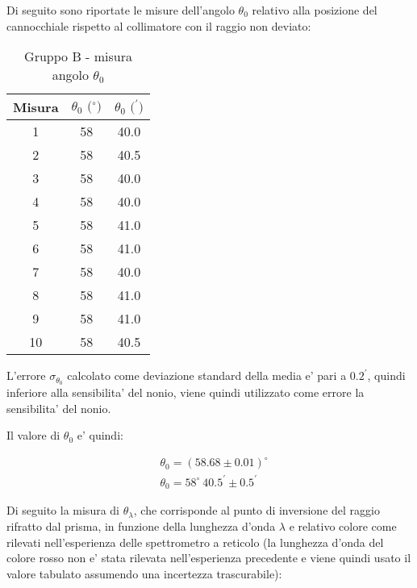 Di seguito sono riportate le misure dell'angolo $\theta_0$ relativo alla posizione del cannocchiale rispetto al collimatore con il raggio non deviato:
\begin{table}[!htbp]
    {\par\centering
    \begin{tabular}{ccc}
        \hline
        Misura & $\theta_0 \text{ ($^{\circ}$)}$ & $\theta_0 \text{ ($^{\prime}$)}$ \\
        \hline
        1   &   58 &   40.0\\
        2   &   58 &   40.5\\
        3   &   58 &   40.0\\
        4   &   58 &   40.0\\
        5   &   58 &   41.0\\
        6   &   58 &   41.0\\
        7   &   58 &   40.0\\
        8   &   58 &   41.0\\
        9   &   58 &   41.0\\
        10  &   58 &   40.5\\
        \hline
    \end{tabular}
    \par}
    \caption{Gruppo B - misura angolo $\theta_0$}
\end{table}

L'errore $\sigma_{\theta_0}$ calcolato come deviazione standard della media e' pari a $0.2^{\prime}$, quindi inferiore alla sensibilita' del nonio, viene quindi utilizzato come errore la sensibilita' del nonio.

Il valore di $\theta_0$ e' quindi:

    \begin{align*}
        &\theta_0 = (58.68 \pm 0.01)^{\circ} \\
        &\theta_0 = 58^{\circ} \ 40.5^{\prime} \pm 0.5^{\prime}
    \end{align*}


Di seguito la misura di $\theta_{\lambda}$, che corrisponde al punto di inversione del raggio rifratto dal prisma, in funzione della lunghezza d'onda $\lambda$ e relativo colore come rilevati nell'esperienza delle spettrometro a reticolo (la lunghezza d'onda del colore rosso non e' stata rilevata nell'esperienza precedente e viene quindi usato il valore tabulato assumendo una incertezza trascurabile):

